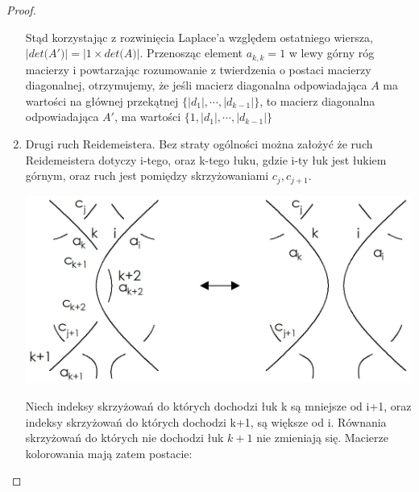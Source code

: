 \begin{proof}
\begin{enumerate}
Stąd korzystając z rozwinięcia Laplace'a względem ostatniego wiersza, $\vert det \big(A'\big) \vert = \vert 1 \times det \big(A\big) \vert$. Przenosząc element $a_{k,k} =1$ w lewy górny róg macierzy i powtarzając rozumowanie z twierdzenia o postaci macierzy diagonalnej, otrzymujemy, że jeśli macierz diagonalna odpowiadająca $A$ ma wartości na głównej przekątnej $\lbrace \vert d_{1} \vert, \cdots, \vert d_{k-1} \vert \rbrace$, to macierz diagonalna odpowiadająca $A'$, ma wartości $\lbrace 1, \vert d_{1} \vert, \cdots, \vert d_{k-1} \vert \rbrace$

\item Drugi ruch Reidemeistera. Bez straty ogólności można założyć że ruch Reidemeistera dotyczy i-tego, oraz k-tego łuku, gdzie i-ty łuk jest łukiem górnym, oraz ruch jest pomiędzy  skrzyżowaniami $ c_{j}, c_{j+1}$. 

\begin{center}
			\includegraphics[scale=0.25]{2/Obrazy/R2det}
\end{center}

Niech indeksy skrzyżowań do których dochodzi łuk k są mniejsze od i+1, oraz indeksy skrzyżowań do których dochodzi k+1, są większe od i. Równania skrzyżowań do których nie dochodzi łuk $k+1$ nie zmieniają się. Macierze kolorowania mają zatem postacie:

\begin{center}


\end{center}
\end{enumerate}
\end{proof}
